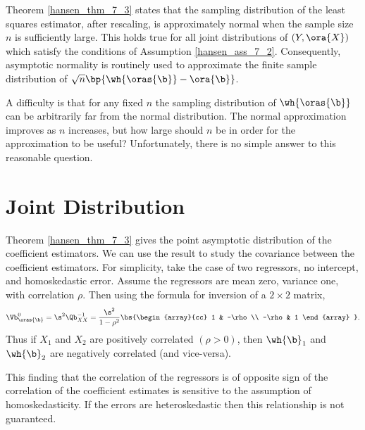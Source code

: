 Theorem \ref{hansen_thm_7_3} states that the sampling distribution of the least squares estimator, after rescaling, is approximately normal when the sample size $n$ is sufficiently large. This holds true for all joint distributions of $(Y, \ora{X})$ which satisfy the conditions of Assumption \ref{hansen_ass_7_2}. Consequently, asymptotic normality is routinely used to approximate the finite sample distribution of $\sqrt{n} \bp{\wh{\oras{\b}} - \ora{\b}}$.

A difficulty is that for any fixed $n$ the sampling distribution of $\wh{\oras{\b}}$ can be arbitrarily far from the normal distribution. The normal approximation improves as $n$ increases, but how large should $n$ be in order for the approximation to be useful? Unfortunately, there is no simple answer to this reasonable question. 


\section{Joint Distribution}
\setcounter{equation}{12}

Theorem \ref{hansen_thm_7_3} gives the point asymptotic distribution of the coefficient estimators. We can use the result to study the covariance between the coefficient estimators. For simplicity, take the case of two regressors, no intercept, and homoskedastic error. Assume the regressors are mean zero, variance one, with correlation $\rho$. Then using the formula for inversion of a $2 \times 2$ matrix, 
\begin{equation}
    \notag
    \Vb_{\oras{\b}}^0 = \s^2 \Qb_{XX}^{-1} = \frac{\s^2}{1 - \rho^2} \bs{\begin{array}{cc}
        1 & -\rho \\
        -\rho & 1 
    \end{array} }.
\end{equation}
Thus if $X_1$ and $X_2$ are positively correlated $(\rho > 0)$, then $\wh{\b}_1$ and $\wh{\b}_2$ are negatively correlated (and vice-versa).

This finding that the correlation of the regressors is of opposite sign of the correlation of the coefficient estimates is sensitive to the assumption of homoskedasticity. If the errors are heteroskedastic then this relationship is not guaranteed.


